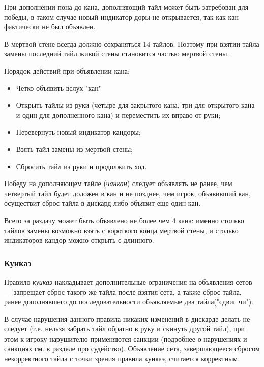 При дополнении пона до кана, дополняющий тайл может быть затребован для победы, в таком случае новый индикатор доры не открывается, так как кан фактически не был объявлен.

В мертвой стене всегда должно сохраняться 14 тайлов. Поэтому при взятии тайла замены последний тайл живой стены  становится частью мертвой стены.

Порядок действий при объявлении кана:
\begin{itemize}
	\item Четко объявить вслух "кан"
	\item Открыть тайлы из руки (четыре для закрытого кана, три для открытого кана и один для дополненного кана) и переместить их вправо от руки;
	\item Перевернуть новый индикатор кандоры;
	\item Взять тайл замены из мертвой стены;
	\item Сбросить тайл из руки и продолжить ход.
\end{itemize}

Победу на дополняющем тайле (\textit{чанкан}) следует объявлять не ранее, чем четвертый тайл будет доложен в кан и не позднее, чем игрок, объявивший кан, осуществит сброс тайла в дискард либо объявит еще один кан.

Всего за раздачу может быть объявлено не более чем 4 кана: именно столько тайлов замены возможно взять с короткого конца мертвой стены, и столько индикаторов кандор можно открыть с длинного. 



\subsubsection{Куикаэ}

Правило \textit{куикаэ} накладывает дополнительные ограничения на объявления сетов --- запрещает сброс такого же тайла после взятия сета, а также сброс тайла, ранее дополнявшего до последовательности объявляемые два тайла("сдвиг чи").

В случае нарушения данного правила никаких изменений в дискарде делать не следует (т.е. нельзя забрать тайл обратно в руку и скинуть другой тайл), при этом к игроку-нарушителю применяются санкции (подробнее о нарушениях и санкциях см. в разделе про судейство). Объявление сета, завершающееся сбросом некорректного тайла с точки зрения правила куикаэ, считается корректным.

